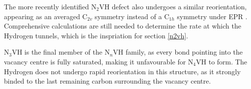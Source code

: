 \documentclass[10pt,a4paper,twocolumn,twoside]{extarticle}
\begin{document}
The more recently identified N$_{2}$VH defect also undergoes a similar reorientation, appearing as an averaged C$_{2v}$ symmetry instead of a C$_{1h}$ symmetry under EPR \cite{Peaker}. Comprehensive calculations are still needed to determine the rate at which the Hydrogen tunnels, which is the inspriation for section \ref{n2vh}. 

N$_{3}$VH is the final member of the N$_{n}$VH family, as every bond pointing into the vacancy centre is fully saturated, making it unfavourable for N$_{4}$VH to form. The Hydrogen does not undergo rapid reorientation in this structure, as it strongly binded to the last remaining carbon surrounding the vacancy centre. 




\printbibliography
\end{document}
